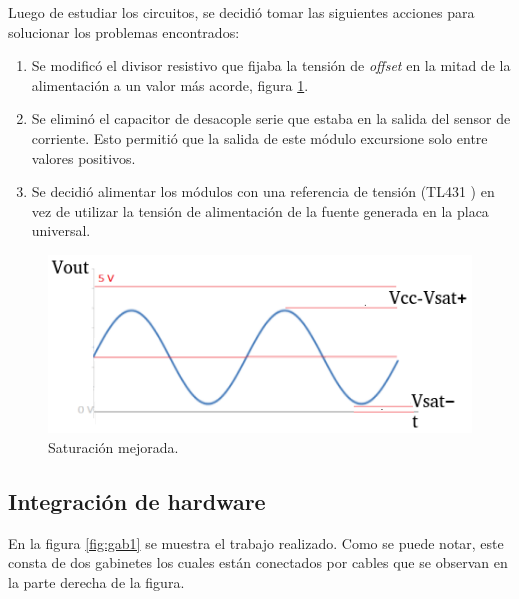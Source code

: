 Luego de estudiar los circuitos, se decidió tomar las siguientes acciones para solucionar los problemas encontrados:
\begin{enumerate}
\item Se modificó el divisor resistivo que fijaba la tensión de \textit{offset} en la mitad de la alimentación a un valor más acorde, figura \ref{fig:sensSatMej}.
\item Se eliminó el capacitor de desacople serie que estaba en la salida del sensor de corriente. Esto permitió que la salida de este módulo excursione solo entre valores positivos.
\item Se decidió alimentar los módulos con una referencia de tensión (TL431 \citep{TL431}) en vez de utilizar la tensión de alimentación de la fuente generada en la placa universal.
\end{enumerate}

\begin{figure}[htpb]
	\centering
	\includegraphics[scale=1]{./Figures/ZMPT101B_waves_sat_mod.png}
	\caption{Saturación mejorada.}
	\label{fig:sensSatMej}
\end{figure}


\subsection{Integración de hardware}

En la figura \ref{fig:gab1} se muestra el trabajo realizado. Como se puede notar, este consta de dos gabinetes los cuales están conectados por cables que se  observan en la parte derecha de la figura. 

